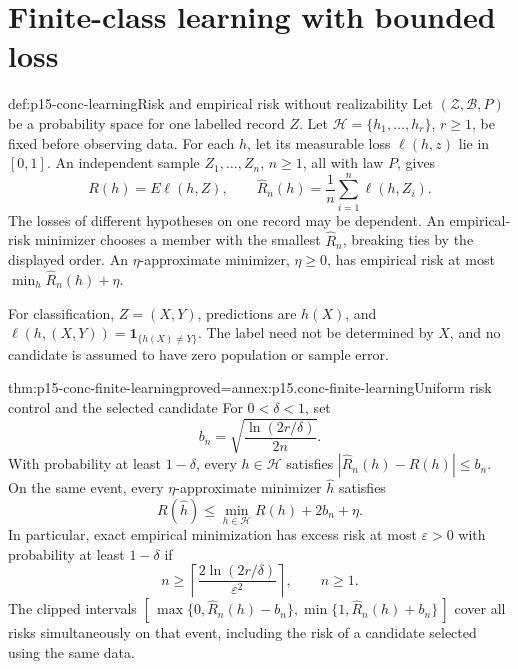 \section{Finite-class learning with bounded loss}

\begin{hbdefinition}{def:p15-conc-learning}{Risk and empirical risk without realizability}
Let \((\mathcal Z,\mathcal B,P)\) be a probability space for one
labelled record \(Z\). Let \(\mathcal H=\{h_1,\ldots,h_r\}\),
\(r\geq1\), be fixed before observing data. For each \(h\),
let its measurable loss \(\ell(h,z)\) lie in \([0,1]\).
An independent sample \(Z_1,\ldots,Z_n\), \(n\geq1\), all with law \(P\), gives
\[
 R(h)=E\ell(h,Z),\qquad
 \widehat R_n(h)=\frac1n\sum_{i=1}^n\ell(h,Z_i).
\]
The losses of different hypotheses on one record may be dependent.
An empirical-risk minimizer chooses a member with the smallest
\(\widehat R_n\), breaking ties by the displayed order.
An \(\eta\)-approximate minimizer, \(\eta\geq0\), has empirical
risk at most \(\min_h\widehat R_n(h)+\eta\).

For classification, \(Z=(X,Y)\), predictions are \(h(X)\),
and \(\ell(h,(X,Y))=\mathbf1_{\{h(X)\ne Y\}}\).
The label need not be determined by \(X\), and no candidate
is assumed to have zero population or sample error.
\end{hbdefinition}

\begin{hbtheorem}{thm:p15-conc-finite-learning}{proved=annex:p15.conc-finite-learning}{Uniform risk control and the selected candidate}
For \(0<\delta<1\), set
\[
                  b_n=\sqrt{\frac{\ln(2r/\delta)}{2n}}.
\]
With probability at least \(1-\delta\), every \(h\in\mathcal H\)
satisfies \(|\widehat R_n(h)-R(h)|\leq b_n\).
On the same event, every \(\eta\)-approximate minimizer
\(\widehat h\) satisfies
\[
 R(\widehat h)\leq\min_{h\in\mathcal H}R(h)+2b_n+\eta.
\]
In particular, exact empirical minimization has excess risk
at most \(\varepsilon>0\) with probability at least \(1-\delta\) if
\[
                 n\geq\left\lceil
                     \frac{2\ln(2r/\delta)}{\varepsilon^2}
                              \right\rceil,\qquad n\geq1.
\]
The clipped intervals
\([\,\max\{0,\widehat R_n(h)-b_n\},
       \min\{1,\widehat R_n(h)+b_n\}\,]\)
cover all risks simultaneously on that event, including the risk
of a candidate selected using the same data.
\end{hbtheorem}

